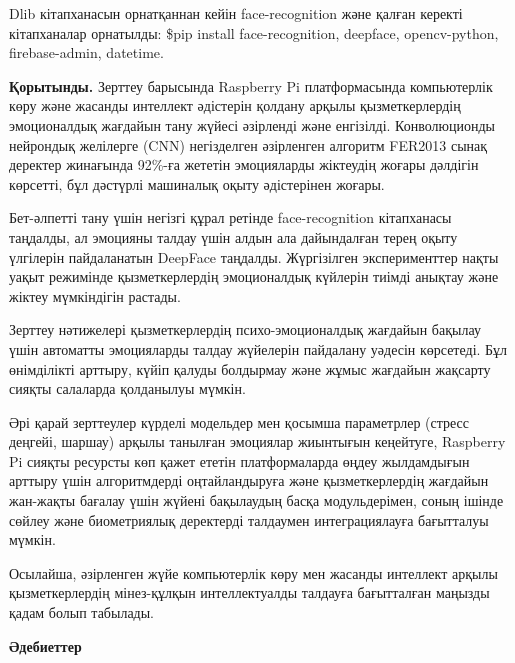 \begin{multicols}{2}
Dlib кітапханасын орнатқаннан кейін face-recognition және қалған керекті
кітапханалар орнатылды: \$pip install face-recognition, deepface,
opencv-python, firebase-admin, datetime.

{\bfseries Қорытынды.} Зерттеу барысында Raspberry Pi платформасында
компьютерлік көру және жасанды интеллект әдістерін қолдану арқылы
қызметкерлердің эмоционалдық жағдайын тану жүйесі әзірленді және
енгізілді. Конволюционды нейрондық желілерге (CNN) негізделген
әзірленген алгоритм FER2013 сынақ деректер жинағында 92\%-ға жететін
эмоцияларды жіктеудің жоғары дәлдігін көрсетті, бұл дәстүрлі машиналық
оқыту әдістерінен жоғары.

Бет-әлпетті тану үшін негізгі құрал ретінде face-recognition кітапханасы
таңдалды, ал эмоцияны талдау үшін алдын ала дайындалған терең оқыту
үлгілерін пайдаланатын DeepFace таңдалды. Жүргізілген эксперименттер
нақты уақыт режимінде қызметкерлердің эмоционалдық күйлерін тиімді
анықтау және жіктеу мүмкіндігін растады.

Зерттеу нәтижелері қызметкерлердің психо-эмоционалдық жағдайын бақылау
үшін автоматты эмоцияларды талдау жүйелерін пайдалану уәдесін көрсетеді.
Бұл өнімділікті арттыру, күйіп қалуды болдырмау және жұмыс жағдайын
жақсарту сияқты салаларда қолданылуы мүмкін.

Әрі қарай зерттеулер күрделі модельдер мен қосымша параметрлер (стресс
деңгейі, шаршау) арқылы танылған эмоциялар жиынтығын кеңейтуге,
Raspberry Pi сияқты ресурсты көп қажет ететін платформаларда өңдеу
жылдамдығын арттыру үшін алгоритмдерді оңтайландыруға және
қызметкерлердің жағдайын жан-жақты бағалау үшін жүйені бақылаудың басқа
модульдерімен, соның ішінде сөйлеу және биометриялық деректерді
талдаумен интеграциялауға бағытталуы мүмкін.

Осылайша, әзірленген жүйе компьютерлік көру мен жасанды интеллект арқылы
қызметкерлердің мінез-құлқын интеллектуалды талдауға бағытталған маңызды
қадам болып табылады.
\end{multicols}

\begin{center}
{\bfseries Әдебиеттер}
\end{center}

